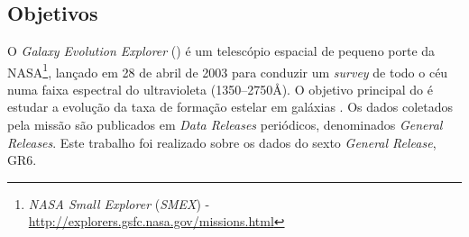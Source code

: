 


\chapter{\galex}
\label{sec:Galex}



\section{Objetivos}
\label{sec:Galex:Objetivos}

O {\em Galaxy Evolution Explorer} (\galex) é um telescópio espacial de pequeno
porte da NASA\footnote{{\em NASA Small Explorer} ({\em SMEX}) -
\url{http://explorers.gsfc.nasa.gov/missions.html}}, lançado em 28 de abril de
2003 para conduzir um {\em survey} de todo o céu numa faixa espectral do
ultravioleta (1350--2750\AA). O objetivo principal do \galex{} é estudar a
evolução da taxa de formação estelar em galáxias \citep{Martin2005}. Os dados
coletados pela missão são publicados em {\em Data Releases} periódicos,
denominados {\em General Releases}. Este trabalho foi realizado sobre os dados
do sexto {\em General Release}, GR6.

